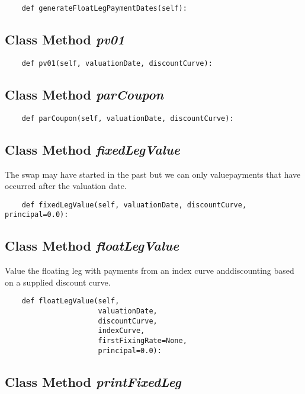\documentclass[twoside,11pt]{book}
\begin{document}
\begin{lstlisting}
    def generateFloatLegPaymentDates(self):
\end{lstlisting}

\subsection{Class Method {\it pv01}}


\begin{lstlisting}
    def pv01(self, valuationDate, discountCurve):
\end{lstlisting}

\subsection{Class Method {\it parCoupon}}


\begin{lstlisting}
    def parCoupon(self, valuationDate, discountCurve):
\end{lstlisting}

\subsection{Class Method {\it fixedLegValue}}
The swap may have started in the past but we can only valuepayments that have occurred after the valuation date. 

\begin{lstlisting}
    def fixedLegValue(self, valuationDate, discountCurve, principal=0.0):
\end{lstlisting}

\subsection{Class Method {\it floatLegValue}}
Value the floating leg with payments from an index curve anddiscounting based on a supplied discount curve. 

\begin{lstlisting}
    def floatLegValue(self,
                      valuationDate,
                      discountCurve,
                      indexCurve,
                      firstFixingRate=None,
                      principal=0.0):
\end{lstlisting}

\subsection{Class Method {\it printFixedLeg}}
\end{document}
